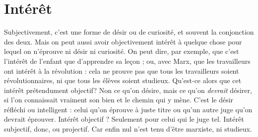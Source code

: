\section{Intérêt}
Subjectivement, c’est une forme de désir ou de curiosité, et souvent
la conjonction des deux. Mais on peut aussi avoir objectivement
intérêt à quelque chose pour lequel on n’éprouve ni désir ni curiosité. On
peut dire, par exemple, que c’est l'intérêt de l’enfant que d’apprendre sa leçon ;
ou, avec Marx, que les travailleurs ont intérêt à la révolution : cela ne prouve
pas que tous les travailleurs soient révolutionnaires, ni que tous les élèves soient
studieux.
Qu'est-ce alors que cet intérêt prétendument objectif? Non ce qu'on
désire, mais ce qu’on {\it devrait} désirer, si l’on connaissait vraiment son bien et le
chemin qui y mène. C’est le désir réfléchi ou intelligent : celui qu’on éprouve à
juste titre ou qu’un autre juge qu’on devrait éprouver. Intérêt objectif ? Seulement
pour celui qui le juge tel. Intérêt subjectif, donc, ou projectif. Car enfin
nul n’est tenu d’être marxiste, ni studieux.

